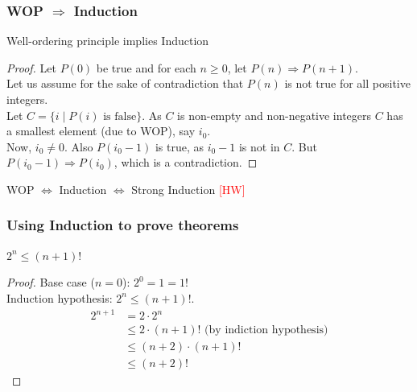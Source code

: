  \begin{frame}[fragile]
\frametitle{WOP $\Rightarrow$ Induction}
\begin{theorem}
Well-ordering principle implies Induction
\end{theorem}
\begin{proof}
Let $P(0)$ be true and for each $n \geq 0$, let $P(n) \Rightarrow P(n+1)$. \\
Let us assume for the sake of contradiction that $P(n)$ is not true for all positive integers. \\
Let $C = \{i \mid P(i) \mbox{ is false}\}$. As $C$ is non-empty and non-negative integers $C$ has a smallest element (due to WOP), say $i_0$.\\
Now, $i_0\neq 0$. Also $P(i_0-1)$ is true, as $i_0-1$ is not in $C$. But $P(i_0-1) \Rightarrow P(i_0)$, which is a contradiction.
\end{proof}

\begin{theorem}
WOP $\Leftrightarrow$ Induction $\Leftrightarrow$ Strong Induction \textcolor{red}{[HW]}
\end{theorem}

\end{frame}

 \begin{frame}[fragile]
\frametitle{Using Induction to prove theorems}
\begin{theorem}
$2^n \leq (n+1)!$
\end{theorem}
\begin{proof}
Base case ($n=0$): $2^0 = 1 = 1!$\\

Induction hypothesis: $2^n \leq (n+1)!$. 
\begin{align*}
2^{n+1} & = 2 \cdot 2^n \\
& \leq 2 \cdot (n+1)! \mbox{     (by indiction hypothesis)}\\
& \leq (n+2) \cdot (n+1)! \\
& \leq (n+2)!
\end{align*}
\end{proof}
\end{frame}

